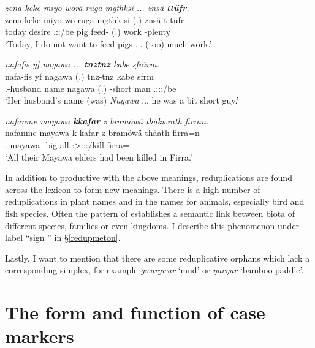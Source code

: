 \begin{exe}
	\ex \emph{zena keke miyo worä ruga mgthksi ... znsä \textbf{ttüfr}.}\\
	\gll zena keke miyo wo ruga mgthk-si (.) znsä t-tüfr\\
	today \Neg{} desire \Fsg.\Sbj:\Nonpast:\Ipfv/be pig feed-\Nmlz{} (.) work \Redup-plenty\\
	\trans `Today, I do not want to feed pigs ... (too) much work.'\\
	\label{ex709}
\end{exe}
\begin{exe}
	\ex \emph{nafafis yf nagawa ... \textbf{tnztnz} kabe sfrärm.}\\
	\gll nafa-fis yf nagawa (.) tnz-tnz kabe sfrm\\
	\Third.\Poss-husband name nagawa (.) \Redup-short man \Tsg.\Masc:\Sbj:\Pst:\Dur/be\\
	\trans `Her husband's name (was) \emph{Nagawa} ... he was a bit short guy.'\\
	\label{ex710}
\end{exe}
\begin{exe}
	\ex	\emph{nafanme mayawa \textbf{kkafar} z bramöwä thäkwrath firran.}\\
	\gll nafanme mayawa k-kafar z bramöwä thäath firra=n\\
	\Tnsg.\Poss{} mayawa \Redup-big \Iam{} all \Stpl:\Sbj>\Stpl:\Obj:\Pst:\Pfv/kill firra=\Loc\\
	\trans `All their Mayawa elders had been killed in Firra.'
	\label{ex721}
\end{exe}
	
In addition to productive  with the above meanings, reduplications are found across the lexicon to form new meanings. There is a high number of reduplications in plant names and in the names for animals, especially bird and fish species. Often the pattern of  establishes a semantic link between biota of different species, families or even kingdoms. I describe this phenomenon under label ``sign '' in \S\ref{redupmeton}.%

Lastly, I want to mention that there are some reduplicative orphans which lack a corresponding simplex, for example \emph{gwargwar} `mud' or \emph{ŋarŋar} `bamboo paddle'.

\section{The form and function of case markers}\label{formfunccase}


